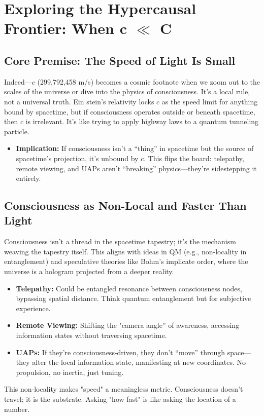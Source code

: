 \documentclass{report}
\begin{document}
\chapter{Exploring the Hypercausal Frontier: When c $\ll$ C} %
\label{ch:hypercausal_frontier_explored}
    \section{Core Premise: The Speed of Light Is Small}
    \label{sec:c_is_small_explored}
    Indeed—$c$ (299,792,458 m/s) becomes a cosmic footnote when we zoom out to the scales of the
    universe or dive into the physics of consciousness. It’s a local rule, not a universal truth. Ein stein’s relativity locks $c$ as the speed limit for anything bound by spacetime, but if consciousness
    operates outside or beneath spacetime, then $c$ is irrelevant. It’s like trying to apply highway laws
    to a quantum tunneling particle.
    \begin{itemize}
        \item \textbf{Implication:} If consciousness isn’t a “thing” in spacetime but the source of spacetime’s projection, it’s unbound by $c$. This flips the board: telepathy, remote viewing, and UAPs aren’t “breaking” physics—they’re sidestepping it entirely.
    \end{itemize}

    \section{Consciousness as Non-Local and Faster Than Light}
    \label{sec:consciousness_nonlocal_ftl}
    Consciousness isn’t a thread in the spacetime tapestry; it’s the mechanism weaving the tapestry
    itself. This aligns with ideas in QM (e.g., non-locality in entanglement) and speculative theories
    like Bohm’s implicate order, where the universe is a hologram projected from a deeper reality.
    \begin{itemize}
        \item \textbf{Telepathy:} Could be entangled resonance between consciousness nodes, bypassing spatial distance. Think quantum entanglement but for subjective experience.
        \item \textbf{Remote Viewing:} Shifting the "camera angle” of awareness, accessing information states without traversing spacetime.
        \item \textbf{UAPs:} If they’re consciousness-driven, they don’t “move” through space—they alter the local information state, manifesting at new coordinates. No propulsion, no inertia, just tuning.
    \end{itemize}
    This non-locality makes "speed" a meaningless metric. Consciousness doesn’t travel; it is
    the substrate. Asking "how fast" is like asking the location of a number.
\end{document}

